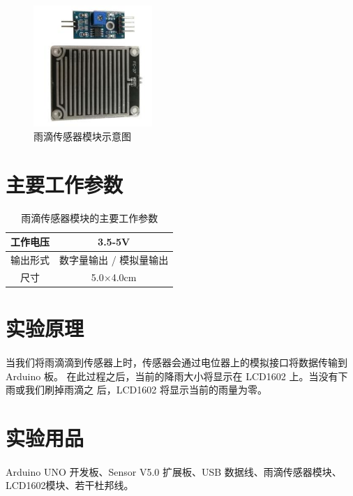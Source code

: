 \documentclass[UTF8, oneside]{ctexbook}
\begin{document}
\begin{figure}[h]
    \centering
    \includegraphics[width=0.4\textwidth]{./result/sensor/16/sensor.png}
    \caption{雨滴传感器模块示意图}
    \label{16_sensor}
\end{figure}

\section{主要工作参数}
\newpage
\begin{table}[h]
    \centering
    \begin{tabular}{|c|c|}
    \hline
    工作电压 & 3.5-5V           \\ \hline
    输出形式 & 数字量输出 / 模拟量输出 \\ \hline
    尺寸   & 5.0$\times$4.0cm \\ \hline
    \end{tabular}
    \caption{雨滴传感器模块的主要工作参数}
\end{table}

\section{实验原理}
\paragraph{}
当我们将雨滴滴到传感器上时，传感器会通过电位器上的模拟接口将数据传输到 Arduino 板。
在此过程之后，当前的降雨大小将显示在 LCD1602 上。当没有下雨或我们刷掉雨滴之
后，LCD1602 将显示当前的雨量为零。

\section{实验用品}
\paragraph{}
Arduino UNO 开发板、Sensor V5.0 扩展板、USB 数据线、雨滴传感器模块、LCD1602模块、若干杜邦线。
\end{document}
